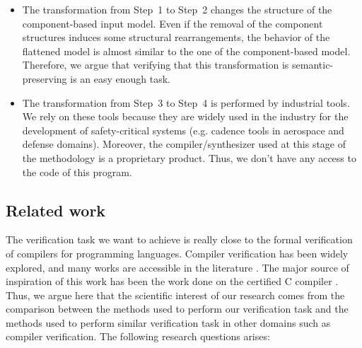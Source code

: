 \documentclass[pdflatex,sn-mathphys]{sn-jnl}%
\theoremstyle{thmstyleone}%
\theoremstyle{thmstyletwo}%
\theoremstyle{thmstylethree}%
\begin{document}
\begin{itemize}
\item The transformation from Step~1 to Step~2 changes the structure
  of the component-based input model. Even if the removal of the
  component structures induces some structural rearrangements, the
  behavior of the flattened model is almost similar to the one of the
  component-based model. Therefore, we argue that verifying that this
  transformation is semantic-preser\-ving is an easy enough task.

\item The transformation from Step~3 to Step~4 is performed by
  industrial tools. We rely on these tools because they are widely
  used in the industry for the development of safety-critical systems
  (e.g. cadence tools in aerospace and defense domains). Moreover, the
  compiler/synthesizer used at this stage of the methodology is a
  proprietary product. Thus, we don't have any access to the code of
  this program. %
\end{itemize}



\subsection{Related work}
\label{sec:related-work}

The verification task we want to achieve is really close to the formal
verification of compilers for programming languages. Compiler
verification has been widely explored, and many works are accessible
in the literature \cite{Dave2003}. The major source of inspiration of
this work has been the work done on the \ccert{} certified C compiler
\cite{Leroy2009}. Thus, we argue here that the scientific interest of
our research comes from the comparison between the methods used to
perform our verification task and the methods used to perform similar
verification task in other domains such as compiler verification. The
following research questions arises:
\end{document}
